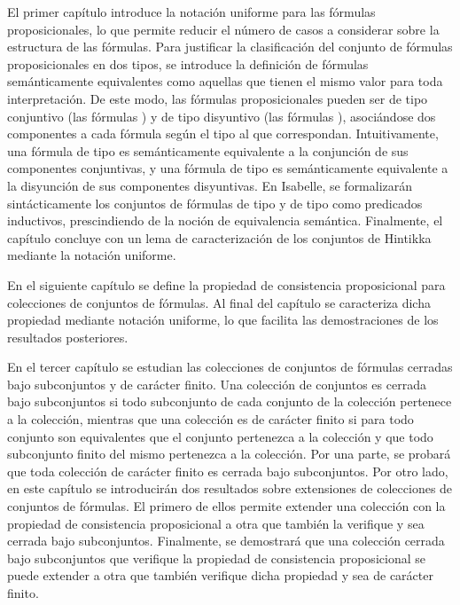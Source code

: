 \begin{isabellebody}
\begin{isamarkuptext}
  El primer capítulo introduce la notación uniforme para las fórmulas
  proposicionales, lo que permite reducir el número de casos a considerar 
  sobre la estructura de las fórmulas. Para justificar la clasificación del 
  conjunto de fórmulas proposicionales en dos tipos, se introduce la definición de 
  fórmulas semánticamente equivalentes como aquellas que tienen el mismo valor 
  para toda interpretación. De este modo, las fórmulas proposicionales pueden ser 
  de tipo conjuntivo (las fórmulas \isa{{\isasymalpha}}) y de tipo disyuntivo (las fórmulas \isa{{\isasymbeta}}),
  asociándose dos componentes a cada fórmula según el tipo al que correspondan. 
  Intuitivamente, una fórmula de tipo \isa{{\isasymalpha}} es semánticamente equivalente a la 
  conjunción de sus componentes conjuntivas, y una fórmula de tipo \isa{{\isasymbeta}} es 
  semánticamente equivalente a la disyunción de sus componentes disyuntivas. En 
  Isabelle, se formalizarán sintácticamente los conjuntos de fórmulas de tipo \isa{{\isasymalpha}} 
  y de tipo \isa{{\isasymbeta}} como predicados inductivos, prescindiendo de la noción de 
  equivalencia semántica. Finalmente, el capítulo concluye con 
  un lema de caracterización de los conjuntos de Hintikka mediante la notación 
  uniforme.

  En el siguiente capítulo se define la propiedad de consistencia proposicional
  para colecciones de conjuntos de fórmulas. Al final del capítulo se caracteriza 
  dicha propiedad mediante notación uniforme, lo que facilita las demostraciones 
  de los resultados posteriores.

  En el tercer capítulo se estudian las colecciones de conjuntos de fórmulas
  cerradas bajo subconjuntos y de carácter finito. Una colección de conjuntos 
  es cerrada bajo subconjuntos si todo subconjunto de cada conjunto de la 
  colección pertenece a la colección, mientras que una colección es de 
  carácter finito si para todo conjunto son equivalentes que el conjunto
  pertenezca a la colección y que todo subconjunto finito del mismo pertenezca
  a la colección. Por una parte, se probará que toda colección de carácter 
  finito es cerrada bajo subconjuntos. Por otro lado, en este capítulo se
  introducirán dos resultados sobre extensiones de colecciones de conjuntos de
  fórmulas. El primero de ellos permite extender una colección con la propiedad de 
  consistencia proposicional a otra que también la verifique y sea cerrada bajo 
  subconjuntos. Finalmente, se demostrará que una colección cerrada bajo 
  subconjuntos que verifique la propiedad de consistencia proposicional se puede 
  extender a otra que también verifique dicha propiedad y sea de carácter finito. 


\end{isamarkuptext}
\end{isabellebody}
